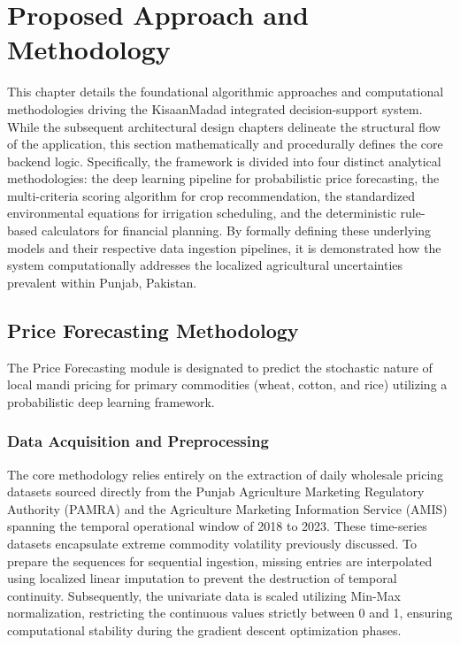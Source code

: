 \chapter{Proposed Approach and Methodology}

This chapter details the foundational algorithmic approaches and computational methodologies driving the KisaanMadad integrated decision-support system. While the subsequent architectural design chapters delineate the structural flow of the application, this section mathematically and procedurally defines the core backend logic. Specifically, the framework is divided into four distinct analytical methodologies: the deep learning pipeline for probabilistic price forecasting, the multi-criteria scoring algorithm for crop recommendation, the standardized environmental equations for irrigation scheduling, and the deterministic rule-based calculators for financial planning. By formally defining these underlying models and their respective data ingestion pipelines, it is demonstrated how the system computationally addresses the localized agricultural uncertainties prevalent within Punjab, Pakistan.

\section{Price Forecasting Methodology}

The Price Forecasting module is designated to predict the stochastic nature of local mandi pricing for primary commodities (wheat, cotton, and rice) utilizing a probabilistic deep learning framework.

\subsection{Data Acquisition and Preprocessing}
The core methodology relies entirely on the extraction of daily wholesale pricing datasets sourced directly from the Punjab Agriculture Marketing Regulatory Authority (PAMRA) and the Agriculture Marketing Information Service (AMIS) spanning the temporal operational window of 2018 to 2023. These time-series datasets encapsulate extreme commodity volatility previously discussed. To prepare the sequences for sequential ingestion, missing entries are interpolated using localized linear imputation to prevent the destruction of temporal continuity. Subsequently, the univariate data is scaled utilizing Min-Max normalization, restricting the continuous values strictly between 0 and 1, ensuring computational stability during the gradient descent optimization phases.

